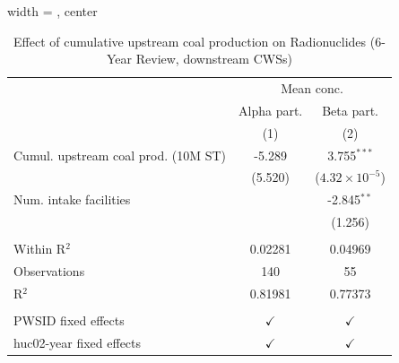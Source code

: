 
\begin{table}[htbp]
   
   \caption{\label{tab:6yr_huc02fe_radio} Effect of cumulative upstream coal production on Radionuclides (6-Year Review, downstream CWSs)}
   \bigskip
   
   \centering
   
   \begin{adjustbox}{width = \textwidth, center}
      
      
      \begin{tabular}{lcc}
         \toprule
         
          & \multicolumn{2}{c}{Mean conc.}\\
         
                                             & Alpha part.   & Beta part. \\   
         
                                             & (1)           & (2)\\  
         
         \midrule 
         Cumul. upstream coal prod. (10M ST) & -5.289        & 3.755$^{***}$\\   
                                             & (5.520)       & ($4.32\times 10^{-5}$)\\    
         Num. intake facilities              &               & -2.845$^{**}$\\   
                                             &               & (1.256)\\   
         
          \\
         
         Within R$^2$                        & 0.02281       & 0.04969\\  
         Observations                        & 140           & 55\\  
         R$^2$                               & 0.81981       & 0.77373\\  
         
          \\
         
         PWSID fixed effects                 & $\checkmark$  & $\checkmark$\\   
         huc02-year fixed effects            & $\checkmark$  & $\checkmark$\\   
         

\end{tabular}
\end{adjustbox}
\end{table}
